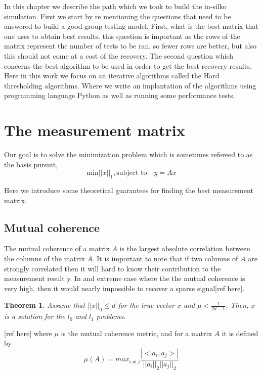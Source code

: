 \documentclass[12pt,a4paper]{article}
\newtheorem{theorem}{Theorem}
\begin{document}
In this chapter we describe the path which we took to build the in-silko simulation. First we start by re mentioning the questions that need to be answered to build a good group testing model. First, what is the best matrix that one uses to obtain best results. this question is important as the rows of the matrix represent the number of tests to be ran, so fewer rows are better, but also this should not come at a cost of the recovery. The second question which concerns the best algorithm to be used in order to get the best recovery results. Here in this work we focus on an iterative algorithms called the Hard thresholding algorithms. Where we write an implantation of the algorithms using programming language Python as well as running some performance tests.  

\section{The measurement matrix}
Our goal is to solve the minimization problem which is sometimes refereed to as the basis pursuit,   \begin{equation}\label{BP}
\text{min}  ||x||_1, \text{subject to}\quad y = Ax 
\end{equation}   	
 
Here we introduce some theoretical guarantees for finding the best measurement matrix.  

\subsection{Mutual coherence}
The mutual coherence of a matrix $ A $ is the largest absolute correlation between the columns of the matrix $ A $. It is important to note that if two columns of $ A $ are strongly correlated then it will hard to know their contribution to the measurement result y. In and extreme case where the the mutual coherence is very high, then it would nearly impossible to recover  a sparse signal[ref here]. 
\begin{theorem}
Assume that $ ||x||_0 \leq d $ for the true vector $ x $ and $ \mu  < \frac{1}{2d-1}$. Then, $ x $ is a solution for the $ l_0 $ and $ l_1 $ problems. 
\end{theorem} [ref here]
where $ \mu $ is the mutual coherence metric, and for a matrix $ A $ it is defined by \begin{equation}\label{key}
\mu(A) = max_{i\neq j} \frac{|<a_i,a_j>|}{||a_i||_2 ||a_j||_2}
\end{equation} 
\end{document}
